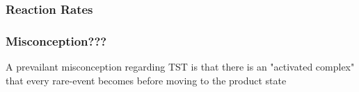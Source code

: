 \subsubsection{Reaction Rates}
\placeholder

\subsubsection{Misconception???}
A prevailant misconception regarding TST is that there is an "activated complex" that every rare-event becomes before moving to the product state

\placeholder

